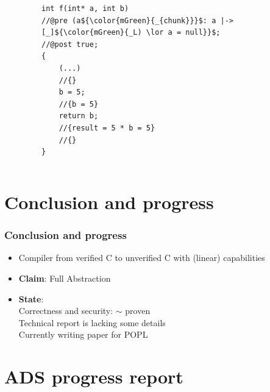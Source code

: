 \documentclass{beamer}
\begin{document}
\begin{frame}[fragile]
\begin{columns}
\begin{column}{0.08\textwidth}
\end{column}

\begin{column}{0.56\textwidth}

\begin{figure}[h]
  \centering
\begin{lstlisting}[style=CStyleNoNum, captionpos = t,title = Source]
int f(int* a, int b)
//@pre (a${\color{mGreen}{_{chunk}}}$: a |-> [_]${\color{mGreen}{_L) \lor a = null}}$;
//@post true;
{
	(...)
	//{}
	b = 5;
	//{b = 5} 
	return b;
	//{result = 5 * b = 5}
	//{}
}
\end{lstlisting}
\end{figure}   

\end{column}
\end{columns}

\end{frame}
\fi
\section{Conclusion and progress}

\begin{frame}
\frametitle{Conclusion and progress}
\begin{itemize}
\item Compiler from verified C to unverified C with (linear) capabilities 
\item \textbf{Claim}: Full Abstraction\\
\item \textbf{State}: \\
\qquad Correctness and security: $\sim$ proven\\
  \qquad\qquad Technical report is lacking some details\\
 \qquad Currently writing paper for POPL\\
\end{itemize}
\end{frame}

\section{ADS progress report}
\end{document}
